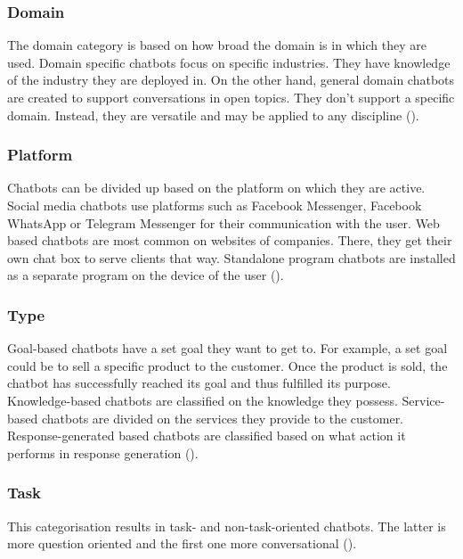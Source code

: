 \subsubsection{Domain}
The domain category is based on how broad the domain is in which they are used. Domain specific chatbots focus on specific industries. They have knowledge of the industry they are deployed in. On the other hand, general domain chatbots are created to support conversations in open topics. They don’t support a specific domain. Instead, they are versatile and may be applied to any discipline (\cite{Maroengsit2019}).\\

\subsubsection{Platform}
Chatbots can be divided up based on the platform on which they are active. Social media chatbots use platforms such as Facebook Messenger, Facebook WhatsApp or Telegram Messenger for their communication with the user. Web based chatbots are most common on websites of companies. There, they get their own chat box to serve clients that way. Standalone program chatbots are installed as a separate program on the device of the user (\cite{Maroengsit2019}).\\

\subsubsection{Type}
Goal-based chatbots have a set goal they want to get to. For example, a set goal could be to sell a specific product to the customer. Once the product is sold, the chatbot has successfully reached its goal and thus fulfilled its purpose. Knowledge-based chatbots are classified on the knowledge they possess. Service-based chatbots are divided on the services they provide to the customer. Response-generated based chatbots are classified based on what action it performs in response generation (\cite{Nuruzzaman2018}).\\

\subsubsection{Task}
This categorisation results in task- and non-task-oriented chatbots. The latter is more question oriented and the first one more conversational (\cite{Nuruzzaman2018}).\\

